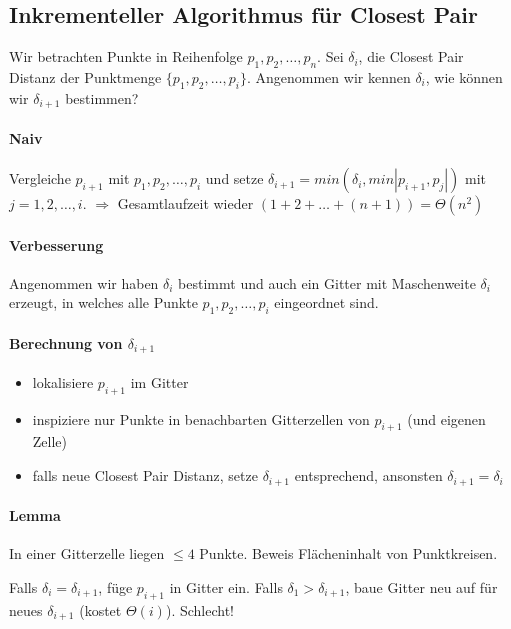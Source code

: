 \subsection{Inkrementeller Algorithmus für Closest Pair}
Wir betrachten Punkte in Reihenfolge $p_1,p_2,\dots,p_n$. Sei $\delta_i$, die Closest Pair Distanz der Punktmenge $\{ p_1,p_2,\dots,p_i \}$. Angenommen wir kennen $\delta_i$, wie können wir $\delta_{i+1}$ bestimmen?

\paragraph*{Naiv} Vergleiche $p_{i+1}$ mit $p_1,p_2,\dots,p_i$ und setze $\delta_{i+1} = min(\delta_i, min|p_{i+1},p_j|)$ mit $j = 1,2,\dots,i$. $\Rightarrow$ Gesamtlaufzeit wieder $(1+2+\dots+(n+1)) = \Theta(n^2)$

\paragraph*{Verbesserung} Angenommen wir haben $\delta_i$ bestimmt und auch ein Gitter mit Maschenweite $\delta_i$ erzeugt, in welches alle Punkte $p_1,p_2,\dots,p_i$ eingeordnet sind.

\paragraph*{Berechnung von $\delta_{i+1}$}
\begin{itemize}
	\item lokalisiere $p_{i+1}$ im Gitter
	\item inspiziere nur Punkte in benachbarten Gitterzellen von $p_{i+1}$ (und eigenen Zelle)
	\item falls neue Closest Pair Distanz, setze $\delta_{i+1}$ entsprechend, ansonsten $\delta_{i+1} = \delta_i$
\end{itemize}

\paragraph*{Lemma} In einer Gitterzelle liegen $\leq 4$ Punkte. Beweis Flächeninhalt von Punktkreisen.

\par\medskip
Falls $\delta_i = \delta_{i+1}$, füge $p_{i+1}$ in Gitter ein. Falls $\delta_1 > \delta_{i+1}$, baue Gitter neu auf für neues $\delta_{i+1}$ (kostet $\Theta(i)$). Schlecht!
\par\medskip

